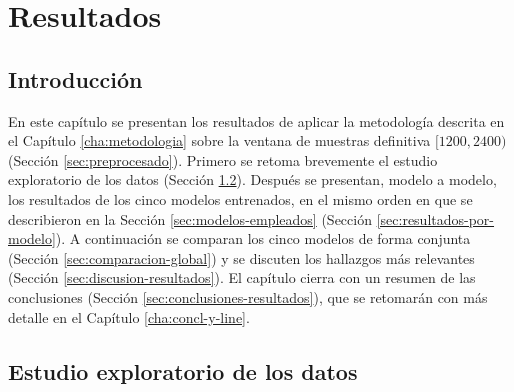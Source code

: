 %
%
%
%
%
%
%
%

\chapter{Resultados}
\label{cha:resultados}


\section{Introducción}
\label{sec:introduccion-resultados}

En este capítulo se presentan los resultados de aplicar la metodología descrita en el Capítulo \ref{cha:metodologia} sobre la ventana de muestras definitiva $[1200, 2400)$ (Sección \ref{sec:preprocesado}). Primero se retoma brevemente el estudio exploratorio de los datos (Sección \ref{sec:estudio-exploratorio-datos}). Después se presentan, modelo a modelo, los resultados de los cinco modelos entrenados, en el mismo orden en que se describieron en la Sección \ref{sec:modelos-empleados} (Sección \ref{sec:resultados-por-modelo}). A continuación se comparan los cinco modelos de forma conjunta (Sección \ref{sec:comparacion-global}) y se discuten los hallazgos más relevantes (Sección \ref{sec:discusion-resultados}). El capítulo cierra con un resumen de las conclusiones (Sección \ref{sec:conclusiones-resultados}), que se retomarán con más detalle en el Capítulo \ref{cha:concl-y-line}.


\section{Estudio exploratorio de los datos}
\label{sec:estudio-exploratorio-datos}

